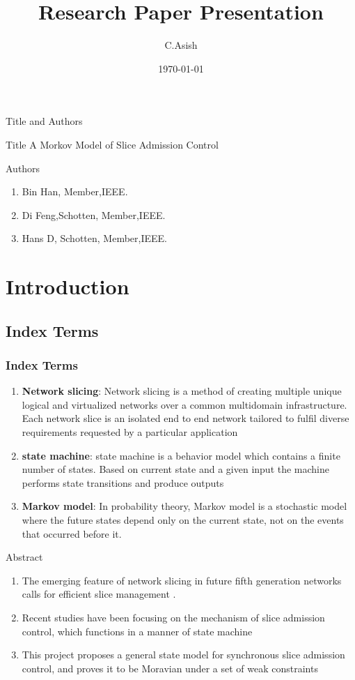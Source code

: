\documentclass{beamer}
\title{Research Paper Presentation}
\author{C.Asish}
\institute{IITH}
\date{\today}
\begin{document}
\begin{frame}
\titlepage
\end{frame}
\begin{frame}{Title and Authors}
\begin{block}{Title}
A Morkov Model of Slice Admission Control
\end{block}
\begin{block}{Authors}
\begin{enumerate}
    \item Bin Han, Member,IEEE.
    \item Di Feng,Schotten, Member,IEEE.
    \item Hans D, Schotten, Member,IEEE.
\end{enumerate}
\end{block}
\end{frame}
\section{\textbf{Introduction}}
\subsection*{Index Terms}
\begin{frame}[fragile]
\frametitle{Index Terms}
\begin{enumerate}
    \item \textbf{Network slicing}: Network slicing is a method of creating multiple unique logical and virtualized networks over a common multidomain infrastructure. Each network slice is an isolated end to end network tailored to fulfil diverse requirements requested by a particular application 
    \item \textbf{state machine}: state machine is a behavior model which contains a finite number of states. Based on current state and a given input the machine performs state transitions and produce outputs 
    \item \textbf{Markov model}: In probability theory, Markov model is a stochastic model where the future states depend only on the current state, not on the events that occurred before it.
\end{enumerate}
\end{frame}

\begin{frame}{Abstract}
\begin{enumerate}
    \item The emerging feature of network slicing in future fifth generation networks calls for efficient slice management .
    \item  Recent studies have been focusing on the mechanism of slice admission control, which functions in a manner of state machine 
    \item This project proposes a general state model for synchronous slice admission control, and proves it to be Moravian under a set of weak constraints 
\end{enumerate}
\end{frame}
\end{document}
